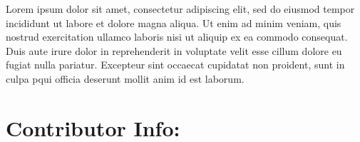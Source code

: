 \documentclass{article}
\begin{document}
\begin{normalsize}
Lorem ipsum dolor sit amet, consectetur adipiscing elit, sed do eiusmod tempor
incididunt ut labore et dolore magna aliqua. Ut enim ad minim veniam, quis nostrud
exercitation ullamco laboris nisi ut aliquip ex ea commodo consequat. Duis aute
irure dolor in reprehenderit in voluptate velit esse cillum dolore eu fugiat nulla
pariatur. Excepteur sint occaecat cupidatat non proident, sunt in culpa pqui
officia deserunt mollit anim id est laborum.

\section{Contributor Info:}



\end{normalsize}
\end{document}
